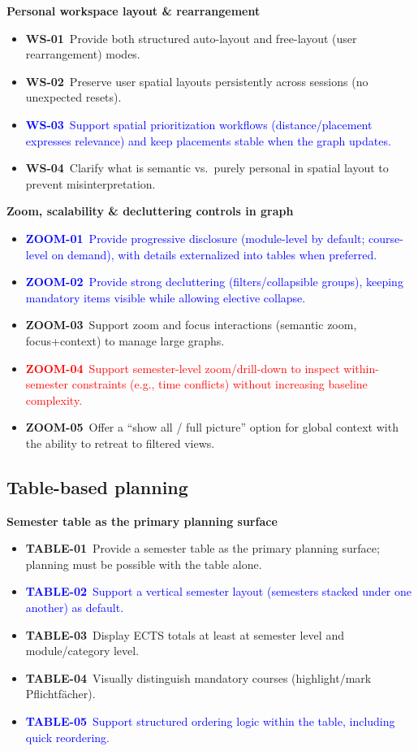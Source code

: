 \textbf{Personal workspace layout \& rearrangement}
\begin{itemize}
  \item \textbf{WS-01}~Provide both structured auto-layout and free-layout (user rearrangement) modes.
  \item \textbf{WS-02}~Preserve user spatial layouts persistently across sessions (no unexpected resets).
  \item \textcolor{blue}{\textbf{WS-03}~Support spatial prioritization workflows (distance/placement expresses relevance) and keep placements stable when the graph updates.}
  \item \textbf{WS-04}~Clarify what is semantic vs.\ purely personal in spatial layout to prevent misinterpretation.
\end{itemize}

\textbf{Zoom, scalability \& decluttering controls in graph}
\begin{itemize}
  \item \textcolor{blue}{\textbf{ZOOM-01}~Provide progressive disclosure (module-level by default; course-level on demand), with details externalized into tables when preferred.}
  \item \textcolor{blue}{\textbf{ZOOM-02}~Provide strong decluttering (filters/collapsible groups), keeping mandatory items visible while allowing elective collapse.}
  \item \textbf{ZOOM-03}~Support zoom and focus interactions (semantic zoom, focus+context) to manage large graphs.
  \item \textcolor{red}{\textbf{ZOOM-04}~Support semester-level zoom/drill-down to inspect within-semester constraints (e.g., time conflicts) without increasing baseline complexity.}
  \item \textbf{ZOOM-05}~Offer a “show all / full picture” option for global context with the ability to retreat to filtered views.
\end{itemize}


\subsection*{Table-based planning}

\textbf{Semester table as the primary planning surface}
\begin{itemize}
  \item \textbf{TABLE-01}~Provide a semester table as the primary planning surface; planning must be possible with the table alone.
  \item \textcolor{blue}{\textbf{TABLE-02}~Support a vertical semester layout (semesters stacked under one another) as default.}
  \item \textbf{TABLE-03}~Display ECTS totals at least at semester level and module/category level.
  \item \textbf{TABLE-04}~Visually distinguish mandatory courses (highlight/mark Pflichtf\"acher).
  \item \textcolor{blue}{\textbf{TABLE-05}~Support structured ordering logic within the table, including quick reordering.}
\end{itemize}

